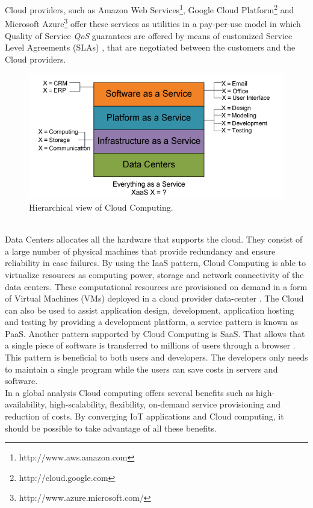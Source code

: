 Cloud providers, such as Amazon Web Services\footnote{http://www.aws.amazon.com},
Google Cloud Platform\footnote{http://cloud.google.com} and Microsoft Azure\footnote{http://www.azure.microsoft.com/}
offer these services as utilities in a pay-per-use model in which Quality of Service \textit{QoS}
guarantees are offered by means of customized Service Level Agreements (SLAs) \cite{vaquero2008break},
that are negotiated between the customers and the Cloud providers.
\begin{figure}[h!]
  \centering
  \includegraphics[width=.8\textwidth]{./images/high_level_cloud_view}
  \caption{Hierarchical view of Cloud Computing.}
  \label{fig:high_level_cloud_view}
\end{figure}\\
Data Centers allocates all the hardware that supports the cloud. They consist of
a large number of physical machines that provide redundancy and ensure reliability
in case failures. By using the IaaS pattern, Cloud Computing is able to virtualize
resources as computing power, storage and network connectivity of the data centers.
These computational resources are provisioned on demand in a form of Virtual Machines (VMs)
deployed in a cloud provider data-center \cite{sotomayor2009virtual}. The Cloud can also
be used to assist application design, development, application hosting and testing by providing
a development platform, a service pattern is known as PaaS. Another pattern supported by
Cloud Computing is SaaS. That allows that a single piece of software is transferred to millions
of users through a browser \cite{zhang2010cloud}. This pattern is beneficial to both users
and developers. The developers only needs to maintain a single program while the users can
save costs in servers and software.\\

In a global analysis Cloud computing offers several benefits such as high-availability,
high-scalability, flexibility, on-demand service provisioning and reduction of costs.
By converging IoT applications and Cloud computing, it should be possible to take advantage
of all these benefits.

